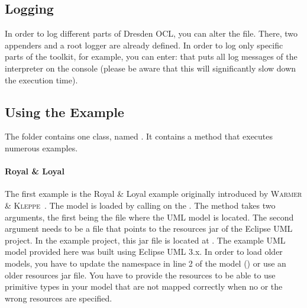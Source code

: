 \subsection{Logging}

In order to log different parts of Dresden OCL, you can alter the
 file. There, two appenders and a root logger are 
already defined. In order to log only specific parts of the toolkit, for
example, you can enter: 
 that puts all log messages of the interpreter on the console (please 
be aware that this will significantly slow down the execution time).


\subsection{Using the Example}

The  folder contains one class, named 
. It contains a  method that 
executes numerous examples.

\paragraph{Royal \& Loyal}
The first example is the Royal \& Loyal example originally introduced by
{\scshape Warmer \& Kleppe}~\cite{warmerEA:ocl03}. The model is loaded by
calling  on the
. The method takes two arguments, the first
being the file where the UML model is located. The second argument needs to be
a file that points to the resources jar of the Eclipse UML project. In the
example project, this jar file is located at 
.
The example UML model provided here was built using Eclipse UML 3.x. In order
to load older models, you have to update the namespace in line 2 of the model 
() or use an older 
resources jar file. You have to provide the resources to be able to use
primitive types in your model that are not mapped correctly when no or the
wrong resources are specified.

